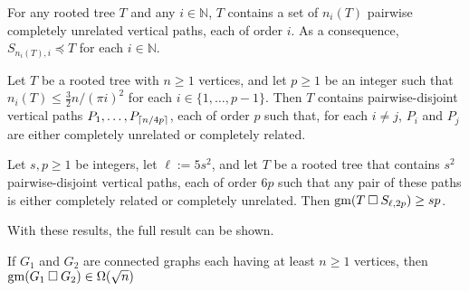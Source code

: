 \documentclass[../main.tex]{subfiles}
\begin{document}
	\begin{obs}\label{same_height_unrelated}
		For any rooted tree $T$ and any $i\in\mathbb{N}$, 
		$T$ contains a set of $n_i(T)$ pairwise completely unrelated vertical paths, each of order $i$.  
		As a consequence, $S_{n_i(T),i}\preceq T$ for each $i\in\mathbb{N}$. 
	\end{obs}
	
	\begin{lem}\label{disjoint_p_paths}
		Let $T$ be a rooted tree with $n\ge 1$ vertices, and let $p\geq 1$ be an integer such that $n_i(T) \leq \frac{3}{2}n/(\pi i)^2$ for each $i\in\{1,\ldots,p-1\}$.  
		Then $T$ contains pairwise-disjoint vertical paths $P_1,\ldots,P_{\lceil n/4p\rceil}$, each of order $p$ such that, for each $i\neq j$, $P_i$ and $P_j$ are either completely unrelated or completely related.
	\end{lem}
	
	\begin{lem}\label{star_times_star}
		Let $s,p\ge 1$ be integers, let $\ell:=5s^2$, and let $T$ be a rooted tree that contains $s^2$ pairwise-disjoint vertical paths, each of order $6p$ such that any pair of these paths is either completely related or completely unrelated.  Then $\operatorname{gm}(T\mathbin{\Box} S_{\ell,2p})\ge sp$.
	\end{lem}
	
	With these results, the full result can be shown.
	
	\begin{thm}\label{lower_bound}
		If $G_1$ and $G_2$ are connected graphs each having at least $n\ge 1$ vertices, then $\operatorname{gm}(G_1\mathbin{\Box} G_2)\in\Omega(\sqrt{n})$
	\end{thm}
	
\end{document}
